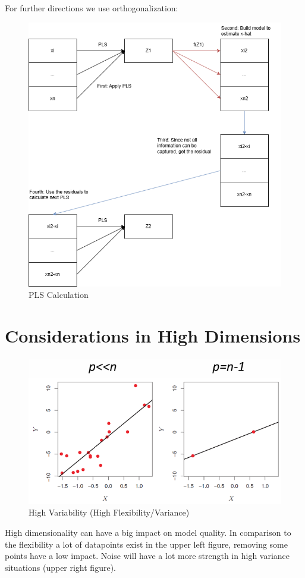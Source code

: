 \documentclass[../Main.tex]{subfiles}
\begin{document}

For further directions we use orthogonalization:
\begin{figure}[H]
    \centering
    \includegraphics[width=0.5\linewidth]{Images/pls-calculation.png}
    \caption{PLS Calculation}
\end{figure}

\newpage
\section{Considerations in High Dimensions}

\begin{figure}[H]
    \centering
    \includegraphics[width=0.5\linewidth]{Images/high-dim-problems.png}
    \caption{High Variability (High Flexibility/Variance)}
\end{figure}
High dimensionality can have a big impact on model quality.
In comparison to the flexibility a lot of datapoints exist in the upper left figure,
removing some points have a low impact.
Noise will have a lot more strength in high variance situations (upper right figure).
\end{document}
